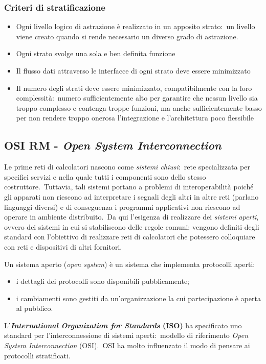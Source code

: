 \subsubsection{Criteri di stratificazione}

\begin{itemize}
    \item Ogni livello logico di astrazione è realizzato in un apposito strato:\ un livello viene creato quando si rende necessario un diverso grado di astrazione.
    \item Ogni strato svolge una sola e ben definita funzione
    \item Il flusso dati attraverso le interfacce di ogni strato deve essere minimizzato
    \item Il numero degli strati deve essere minimizzato, compatibilmente con la loro complessità:\ numero sufficientemente alto per garantire che nessun livello sia troppo complesso e contenga troppe funzioni, ma anche sufficientemente basso per non rendere troppo onerosa l'integrazione e l'architettura poco flessibile
\end{itemize}

\subsection{OSI RM - \emph{Open System Interconnection}}

Le prime reti di calcolatori nascono come \emph{sistemi chiusi}:\ rete specializzata per specifici servizi e nella quale tutti i componenti sono dello stesso costruttore.\
Tuttavia, tali sistemi portano a problemi di interoperabilità poiché gli apparati non riescono ad interpretare i segnali degli altri in altre reti (parlano linguaggi diversi) e di conseguenza i programmi applicativi non riescono ad operare in ambiente distribuito.\
Da qui l'esigenza di realizzare dei \emph{sistemi aperti}, ovvero dei sistemi in cui si stabiliscono delle regole comuni; vengono definiti degli standard con l'obiettivo di realizzare reti di calcolatori che potessero colloquiare con reti e dispositivi di altri fornitori.

Un sistema aperto (\emph{open system}) è un sistema che implementa protocolli aperti:\
\begin{itemize}
    \item i dettagli dei protocolli sono disponibili pubblicamente;
    \item i cambiamenti sono gestiti da un'organizzazione la cui partecipazione è aperta al pubblico.
\end{itemize}
L'\textbf{\emph{International Organization for Standards} (ISO)} ha specificato uno standard per l'interconnessione di sistemi aperti:\ modello di riferimento \emph{Open System Interconnection} (OSI).\
OSI ha molto influenzato il modo di pensare ai protocolli stratificati.

